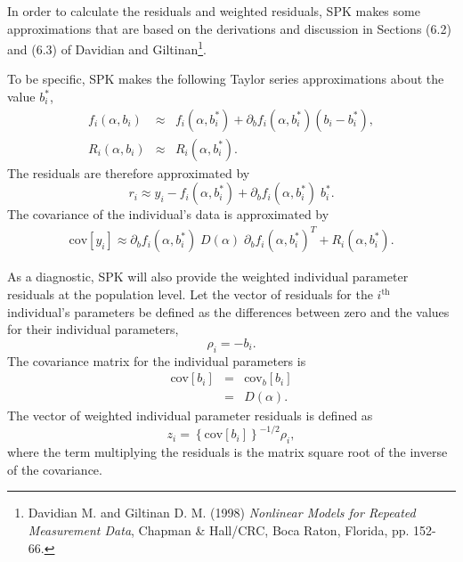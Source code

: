 \documentclass{article}
\begin{document}
In order to calculate the residuals and weighted residuals, SPK makes
some approximations that are based on the derivations and discussion
in Sections (6.2) and (6.3) of Davidian and Giltinan\footnote{
  Davidian M. and Giltinan D. M. (1998) 
  {\em Nonlinear Models for Repeated Measurement Data}, Chapman \&
  Hall/CRC, Boca Raton, Florida, pp. 152-66.
}.

To be specific, SPK makes the following Taylor series approximations 
about the value $b^{\ast}_i$,
  \begin{eqnarray}
    f_i(\alpha, b_i) & \approx &  f_i(\alpha, b^{\ast}_i)
      + \partial_b f_i(\alpha, b^{\ast}_i) ( b_i - b^{\ast}_i ) , \\
    R_i(\alpha, b_i) & \approx &  R_i(\alpha, b^{\ast}_i) .
  \end{eqnarray}
The residuals are therefore approximated by
  \begin{equation}
    r_i \approx y_i - f_i(\alpha, b^{\ast}_i)
      + \partial_b f_i(\alpha, b^{\ast}_i) \; b^{\ast}_i .
  \end{equation}
The covariance of the individual's data is approximated by
  \begin{eqnarray}
    \mbox{cov}[y_i] \approx \partial_b f_i(\alpha, b^{\ast}_i) \;
        D(\alpha) \; \partial_b f_i(\alpha, b^{\ast}_i)^T
      + R_i(\alpha, b^{\ast}_i) .
  \end{eqnarray}

As a diagnostic, SPK will also provide the weighted individual 
parameter residuals at the population level.
Let the vector of residuals for the $i^{\mbox{th}}$ individual's 
parameters be defined as the differences between zero and the 
values for their individual parameters,
  \begin{equation}
    \rho_i = - b_i .
  \end{equation}
The covariance matrix for the individual parameters is
  \begin{eqnarray}
    \mbox{cov}[b_i] & = & \mbox{cov}_{b}
          \left[ b_i \right] \nonumber \\
        & = & D(\alpha) .
  \end{eqnarray}
The vector of weighted individual parameter residuals is
defined as 
  \begin{equation}
    z_i = \left\{ \mbox{cov}[b_i] \right\}^{-1/2} \rho_i,
  \end{equation}
where the term multiplying the residuals is the matrix square 
root of the inverse of the covariance.
\end{document}
